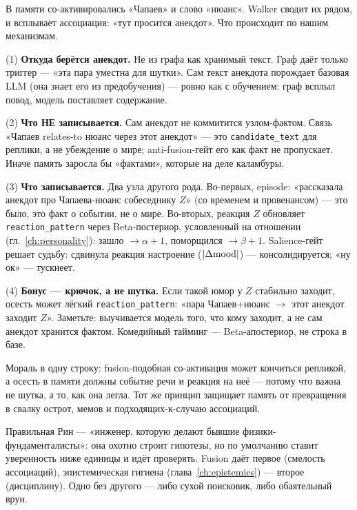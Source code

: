 \begin{workedbox}
В памяти со-активировались «Чапаев» и слово «нюанс». Walker сводит их рядом, и
всплывает ассоциация: «тут просится анекдот». Что происходит по нашим
механизмам.

(1) \textbf{Откуда берётся анекдот.} Не из графа как хранимый текст. Граф даёт
только триггер --- «эта пара уместна для шутки». Сам текст анекдота порождает
базовая LLM (она знает его из предобучения) --- ровно как с обучением: граф
всплыл повод, модель поставляет содержание.

(2) \textbf{Что НЕ записывается.} Сам анекдот не коммитится узлом-фактом. Связь
«Чапаев relates-to нюанс через этот анекдот» --- это \texttt{candidate\_text}
для реплики, а не убеждение о мире; anti-fusion-гейт его как факт не
пропускает. Иначе память заросла бы «фактами», которые на деле каламбуры.

(3) \textbf{Что записывается.} Два узла другого рода. Во-первых, episode:
«рассказала анекдот про Чапаева-нюанс собеседнику $Z$» (со временем и
провенансом) --- это было, это факт о событии, не о мире. Во-вторых, реакция
$Z$ обновляет \texttt{reaction\_pattern} через Beta-постериор, условленный на
отношении (гл.~\ref{ch:personality}): зашло $\to \alpha{+}1$, поморщился
$\to \beta{+}1$. Salience-гейт решает судьбу: сдвинула реакция настроение
($|\Delta \mathrm{mood}|$) --- консолидируется; «ну ок» --- тускнеет.

(4) \textbf{Бонус --- крючок, а не шутка.} Если такой юмор у $Z$ стабильно
заходит, осесть может лёгкий \texttt{reaction\_pattern}: «пара
Чапаев+нюанс $\to$ этот анекдот заходит $Z$». Заметьте: выучивается модель того,
что кому заходит, а не сам анекдот хранится фактом. Комедийный тайминг ---
Beta-апостериор, не строка в базе.
\end{workedbox}

Мораль в одну строку: fusion-подобная со-активация может кончиться репликой, а
осесть в памяти должны событие речи и реакция на неё --- потому что важна не
шутка, а то, как она легла. Тот же принцип защищает память от превращения в
свалку острот, мемов и подходящих-к-случаю ассоциаций.

\begin{intuition}
Правильная Рин --- «инженер, которую делают бывшие физики-фундаменталисты»:
она охотно строит гипотезы, но по умолчанию ставит уверенность ниже единицы и
идёт проверять. Fusion даёт первое (смелость ассоциаций), эпистемическая
гигиена (глава~\ref{ch:epistemics}) --- второе (дисциплину). Одно без другого
--- либо сухой поисковик, либо обаятельный врун.
\end{intuition}
